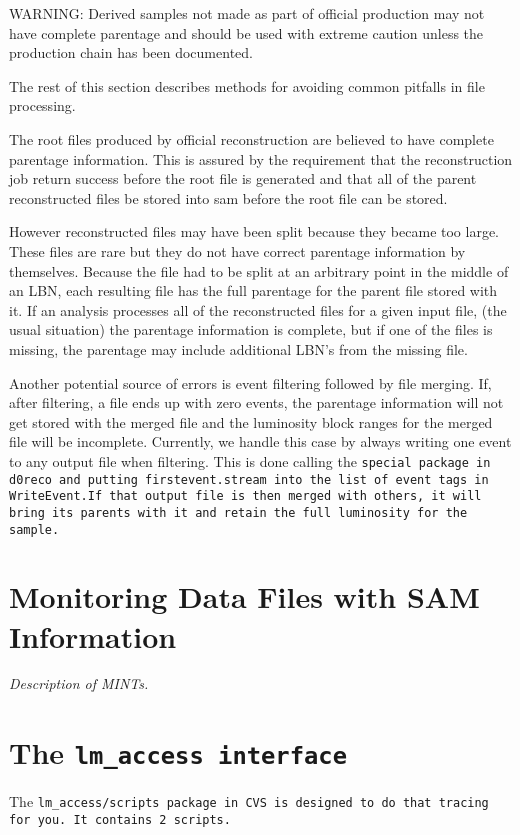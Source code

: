 \documentclass[12pt]{article}
\begin{document}
WARNING: Derived samples not made as part of official production may
not have complete parentage and should be used with extreme caution
unless the production chain has been documented.

The rest of this section describes methods for avoiding common
pitfalls in file processing.

The root files produced by official reconstruction are believed to
have complete parentage information.  This is assured by the
requirement that the reconstruction job return success before the root
file is generated and that all of the parent reconstructed files be
stored into sam before the root file can be stored.

However reconstructed files may have been split because they became
too large. These files are rare but they do not have correct parentage
information by themselves.  Because the file had to be split at an
arbitrary point in the middle of an LBN, each resulting file has the
full parentage for the parent file stored with it.  If an analysis
processes all of the reconstructed files for a given input file, (the
usual situation) the parentage information is complete, but if one of
the files is missing, the parentage may include additional LBN's from
the missing file.

Another potential source of errors is event filtering followed by file
merging.  If, after filtering, a file ends up with zero events, the
parentage information will not get stored with the merged file and the
luminosity block ranges for the merged file will be incomplete.
Currently, we handle this case by always writing one event to any
output file when filtering.  This is done calling the \tt special \rm
package in d0reco and putting \tt firstevent.stream \rm into the list
of event tags in \tt WriteEvent.\rm If that output file is then merged
with others, it will bring its parents with it and retain the full
luminosity for the sample.

\section{Monitoring Data Files with SAM Information}

{\it Description of MINTs.}

\section{The \tt lm\_access \rm interface}

The \tt lm\_access/scripts \rm package in CVS is designed to do that
tracing for you.  It contains 2 scripts.
\end{document}
